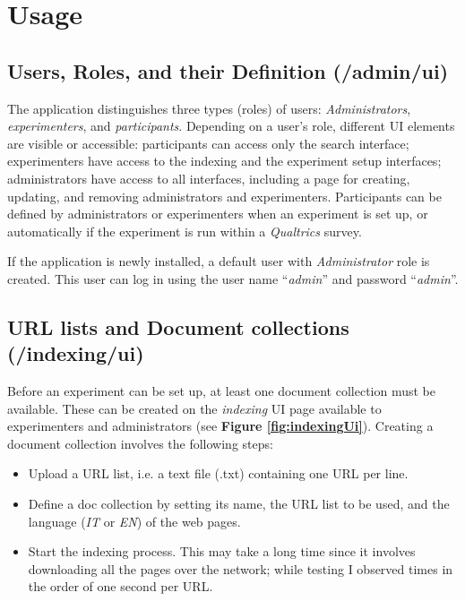 \documentclass[fleqn]{article}
\begin{document}
\section{Usage}
\label{sec:usage}


\subsection{Users, Roles, and their Definition \small{(/admin/ui)}}

The application distinguishes three types (roles) of users: \emph{Administrators}, \emph{experimenters}, and \emph{participants}.
Depending on a user's role, different UI elements are visible or accessible: participants can access only the search interface; 
experimenters have access to the indexing and the experiment setup interfaces; administrators have access to all interfaces,
including a page for creating, updating, and removing administrators and experimenters. Participants can be defined
by administrators or experimenters when an experiment is set up, or automatically if the experiment is run within
a \emph{Qualtrics} survey.

If the application is newly installed, a default user with \emph{Administrator} role is created. This user can log in using
the user name ``\emph{admin}'' and password ``\emph{admin}''.

\subsection{URL lists and Document collections \small{(/indexing/ui)}}

Before an experiment can be set up, at least one document collection must be available. These can be created on the \emph{indexing}
UI page available to experimenters and administrators (see \textbf{Figure \ref{fig:indexingUi}}). Creating a document collection involves
the following steps:
\begin{itemize}

\item Upload a URL list, i.e. a text file (.txt) containing one URL per line.

\item Define a doc collection by setting its name, the URL list to be used, and the language (\emph{IT} or \emph{EN})
        of the web pages.

\item Start the indexing process. This may take a long time since it involves downloading all the pages over the network;
      while testing I observed times in the order of one second per URL.

\end{itemize}
\end{document}
